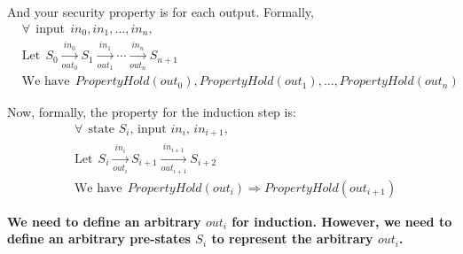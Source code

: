 \documentclass{article}
\begin{document}
And your security property is for each output.
Formally,
\begin{align*}
& \forall ~~ \text{input} ~~ in_0, in_1, \dots, in_n, \\
& \text{Let} ~~ S_0 \xrightarrow[out_0]{in_0} S_{1} \xrightarrow[out_1]{in_1} \cdots \xrightarrow[out_n]{in_n} S_{n+1} \\
& \text{We have} ~~ PropertyHold(out_0), PropertyHold(out_1), \dots, PropertyHold(out_n)
\end{align*}

Now, formally, the property for the induction step is:
\begin{align*}
& \forall ~~ \text{state $S_i$, input $in_i$, $in_{i+1}$}, \\
& \text{Let} ~~ S_i \xrightarrow[out_{i}]{in_i} S_{i+1} \xrightarrow[out_{i+1}]{in_{i+1}} S_{i+2} \\
& \text{We have} ~~ PropertyHold(out_{i}) \Rightarrow PropertyHold(out_{i+1})
\end{align*}

\textbf{We need to define an arbitrary $out_i$ for induction. However, we need to define an arbitrary pre-states $S_i$ to represent the arbitrary $out_i$.}





\end{document}
